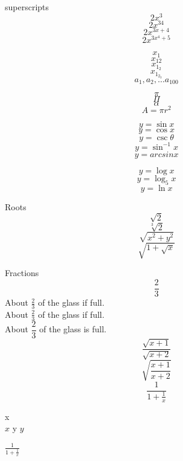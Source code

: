 \documentclass[11pt]{article}
\begin{document}
superscripts $$2x^3$$
$$2x^{34}$$
$$2x^{3x + 4}$$
$$2x^{3x^4+5}$$


$$x_1$$
$$x_{12}$$
$$x_{1_2}$$
$$x_{1_{2_3}}$$
$$a_1, a_2, \ldots a_{100}$$

$$\pi$$ %
$$\Pi$$ %
$$\alpha$$
$$A = \pi r^2$$

$$y = \sin x$$
$$y = \cos x$$
$$ y = \csc \theta$$
$$ y = \sin ^{-1}x$$
$$y = arcsin x$$

$$y = \log x$$
$$y = \log_5 x$$
$$y = \ln x$$

Roots
$$\sqrt{2}$$
$$\sqrt[3]{2}$$
$$\sqrt{x^2+y^2}$$
$$\sqrt{1+\sqrt{x}}$$

Fractions
$$\frac{2}{3}$$
About $\frac{2}{3}$ of the glass if full.\\[16pt]
About $\displaystyle \frac{2}{3}$ of the glass if full. \\[16pt]%
About $\dfrac{2}{3}$ of the glass is full.\\[6pt]

$$\frac{\sqrt{x+1}}{\sqrt{x+2}}$$
$$\sqrt{\frac{x+1}{x+2}}$$
$$\frac{1}{1+\frac{1}{x}}$$

x\\
$x$
y $y$

$\frac{1}{1 + \frac{1}{x}}$
\end{document}
